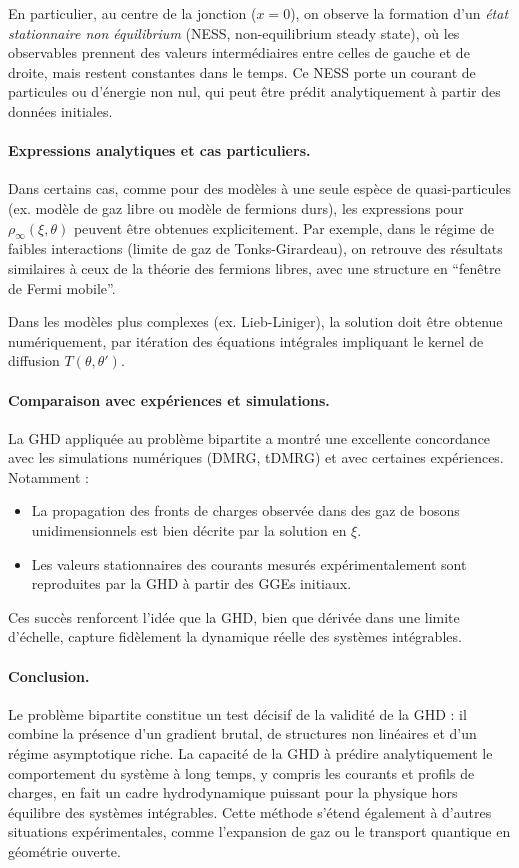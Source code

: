 En particulier, au centre de la jonction ($x=0$), on observe la formation d’un \textit{état stationnaire non équilibrium} (NESS, non-equilibrium steady state), où les observables prennent des valeurs intermédiaires entre celles de gauche et de droite, mais restent constantes dans le temps. Ce NESS porte un courant de particules ou d’énergie non nul, qui peut être prédit analytiquement à partir des données initiales.

\paragraph{Expressions analytiques et cas particuliers.}
Dans certains cas, comme pour des modèles à une seule espèce de quasi-particules (ex. modèle de gaz libre ou modèle de fermions durs), les expressions pour $\rho_\infty(\xi,\theta)$ peuvent être obtenues explicitement. Par exemple, dans le régime de faibles interactions (limite de gaz de Tonks-Girardeau), on retrouve des résultats similaires à ceux de la théorie des fermions libres, avec une structure en “fenêtre de Fermi mobile”.

Dans les modèles plus complexes (ex. Lieb-Liniger), la solution doit être obtenue numériquement, par itération des équations intégrales impliquant le kernel de diffusion $T(\theta,\theta')$.

\paragraph{Comparaison avec expériences et simulations.}
La GHD appliquée au problème bipartite a montré une excellente concordance avec les simulations numériques (DMRG, tDMRG) et avec certaines expériences. Notamment :
\begin{itemize}
    \item La propagation des fronts de charges observée dans des gaz de bosons unidimensionnels est bien décrite par la solution en $\xi$.
    \item Les valeurs stationnaires des courants mesurés expérimentalement sont reproduites par la GHD à partir des GGEs initiaux.
\end{itemize}
Ces succès renforcent l’idée que la GHD, bien que dérivée dans une limite d’échelle, capture fidèlement la dynamique réelle des systèmes intégrables.

\paragraph{Conclusion.}
Le problème bipartite constitue un test décisif de la validité de la GHD : il combine la présence d’un gradient brutal, de structures non linéaires et d’un régime asymptotique riche. La capacité de la GHD à prédire analytiquement le comportement du système à long temps, y compris les courants et profils de charges, en fait un cadre hydrodynamique puissant pour la physique hors équilibre des systèmes intégrables. Cette méthode s’étend également à d’autres situations expérimentales, comme l’expansion de gaz ou le transport quantique en géométrie ouverte.


